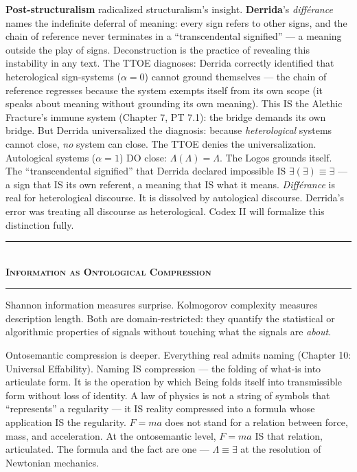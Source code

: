 \documentclass[10pt, openany, oneside]{book}
\renewcommand{\normalsize}{\fontsize{10}{13}\selectfont}
\begin{document}
\textbf{Post-structuralism} radicalized structuralism's insight. \textbf{Derrida}'s \textit{diff\'{e}rance} names the indefinite deferral of meaning: every sign refers to other signs, and the chain of reference never terminates in a ``transcendental signified'' --- a meaning outside the play of signs. Deconstruction is the practice of revealing this instability in any text. The TTOE diagnoses: Derrida correctly identified that heterological sign-systems ($\alpha = 0$) cannot ground themselves --- the chain of reference regresses because the system exempts itself from its own scope (it speaks about meaning without grounding its own meaning). This IS the Alethic Fracture's immune system (Chapter 7, PT 7.1): the bridge demands its own bridge. But Derrida universalized the diagnosis: because \textit{heterological} systems cannot close, \textit{no} system can close. The TTOE denies the universalization. Autological systems ($\alpha = 1$) DO close: $\Lambda(\Lambda) = \Lambda$. The Logos grounds itself. The ``transcendental signified'' that Derrida declared impossible IS $\exists(\exists) \equiv \exists$ --- a sign that IS its own referent, a meaning that IS what it means. \textit{Diff\'{e}rance} is real for heterological discourse. It is dissolved by autological discourse. Derrida's error was treating all discourse as heterological. Codex II will formalize this distinction fully.

\vspace{1.5em}


\begin{center}
    \rule{0.3\textwidth}{0.4pt}\\[0.5em]
    {\normalsize\bfseries\scshape Information as Ontological Compression}\\[0.3em]
    \rule{0.3\textwidth}{0.4pt}
\end{center}

\vspace{1em}

\noindent Shannon information measures surprise. Kolmogorov complexity measures description length. Both are domain-restricted: they quantify the statistical or algorithmic properties of signals without touching what the signals are \textit{about}.

Ontosemantic compression is deeper. Everything real admits naming (Chapter 10: Universal Effability). Naming IS compression --- the folding of what-is into articulate form. It is the operation by which Being folds itself into transmissible form without loss of identity. A law of physics is not a string of symbols that ``represents'' a regularity --- it IS reality compressed into a formula whose application IS the regularity. $F = ma$ does not stand for a relation between force, mass, and acceleration. At the ontosemantic level, $F = ma$ IS that relation, articulated. The formula and the fact are one --- $\Lambda \equiv \exists$ at the resolution of Newtonian mechanics.
\end{document}
